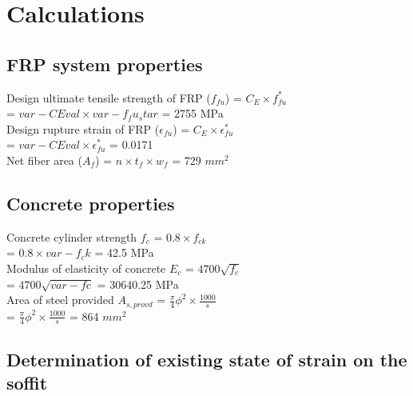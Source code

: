 \documentclass[12pt,a4paper]{article} %
\newcommand{\tab}{\hspace*{2em}} %
\begin{document}
\section{Calculations} 

\subsection{FRP system properties}

\tab Design ultimate tensile strength of FRP ($f_{fu}$) = $C_E \times f_{fu}^*$ \\[8pt]

\tab\tab\tab\tab\tab = $var-CEval \times var-f_fu_star$ = 2755 MPa \\[8pt]

\tab Design rupture strain of FRP ($\epsilon_{fu}$) = $C_E \times \epsilon_{fu}^*$ \\[8pt]

\tab\tab\tab\tab\tab = $var-CEval \times \epsilon_{fu}^*$ = 0.0171 \\[8pt]

\tab Net fiber area ($A_f$) = $n \times t_f \times w_f$ = 729 $mm^2$ \\[8pt]

\subsection{Concrete properties}

\tab Concrete cylinder strength $f_c$ = $0.8 \times f_{ck}$ \\[8pt]

\tab\tab\tab\tab\tab = $0.8 \times var-f_ck$ = 42.5 MPa \\[8pt]

\tab Modulus of elasticity of concrete $E_c$ = $4700 \sqrt{f_c}$ \\[8pt]

\tab\tab\tab\tab\tab = $4700 \sqrt{var-fc}$ = 30640.25 MPa \\[8pt]

\tab Area of steel provided $A_{s,provd}$ = $\frac{\pi}{4}\phi^2 \times \frac{1000}{s}$ \\[8pt]

\tab\tab\tab\tab\tab = $\frac{\pi}{4}\phi^2 \times \frac{1000}{s}$ = 864 $mm^2$ \\[8pt] 

\subsection{Determination of existing state of strain on the soffit}
\end{document}
